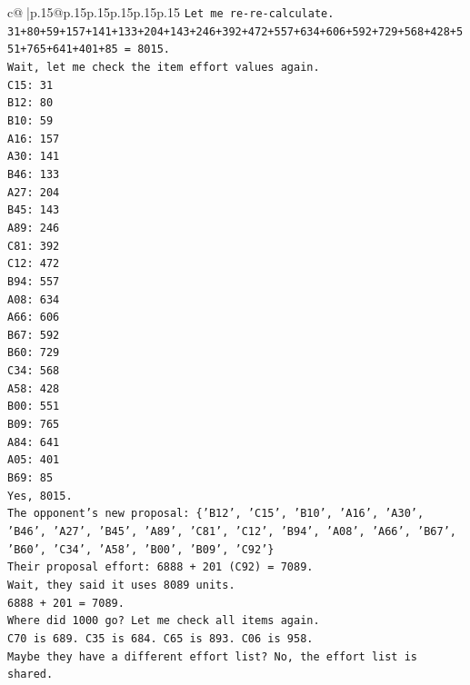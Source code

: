 \documentclass{article}
\begin{document}
{\begin{supertabular}{c@{$\;$}|p{.15\linewidth}@{}p{.15\linewidth}p{.15\linewidth}p{.15\linewidth}p{.15\linewidth}p{.15\linewidth}}
{{{\texttt{Let me re{-}re{-}calculate.} \\
\texttt{31+80+59+157+141+133+204+143+246+392+472+557+634+606+592+729+568+428+551+765+641+401+85 = 8015.} \\
\texttt{Wait, let me check the item effort values again.} \\
\texttt{C15: 31} \\
\texttt{B12: 80} \\
\texttt{B10: 59} \\
\texttt{A16: 157} \\
\texttt{A30: 141} \\
\texttt{B46: 133} \\
\texttt{A27: 204} \\
\texttt{B45: 143} \\
\texttt{A89: 246} \\
\texttt{C81: 392} \\
\texttt{C12: 472} \\
\texttt{B94: 557} \\
\texttt{A08: 634} \\
\texttt{A66: 606} \\
\texttt{B67: 592} \\
\texttt{B60: 729} \\
\texttt{C34: 568} \\
\texttt{A58: 428} \\
\texttt{B00: 551} \\
\texttt{B09: 765} \\
\texttt{A84: 641} \\
\texttt{A05: 401} \\
\texttt{B69: 85} \\
\texttt{Yes, 8015.} \\
\texttt{The opponent's new proposal: \{'B12', 'C15', 'B10', 'A16', 'A30', 'B46', 'A27', 'B45', 'A89', 'C81', 'C12', 'B94', 'A08', 'A66', 'B67', 'B60', 'C34', 'A58', 'B00', 'B09', 'C92'\}} \\
\texttt{Their proposal effort: 6888 + 201 (C92) = 7089.} \\
\texttt{Wait, they said it uses 8089 units.} \\
\texttt{6888 + 201 = 7089.} \\
\texttt{Where did 1000 go? Let me check all items again.} \\
\texttt{C70 is 689. C35 is 684. C65 is 893. C06 is 958.} \\
\texttt{Maybe they have a different effort list? No, the effort list is shared.} \\
}}}
\end{supertabular}}
\end{document}
